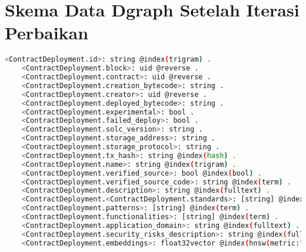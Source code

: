 \chapter{Skema Data Dgraph Setelah Iterasi Perbaikan}
\label{appendix:skema-dgraph-iterasi-perbaikan}

\begin{lstlisting}[language=bash]
    <ContractDeployment.id>: string @index(trigram) .
    <ContractDeployment.block>: uid @reverse .
    <ContractDeployment.contract>: uid @reverse .
    <ContractDeployment.creation_bytecode>: string .
    <ContractDeployment.creator>: uid @reverse .
    <ContractDeployment.deployed_bytecode>: string .
    <ContractDeployment.experimental>: bool .
    <ContractDeployment.failed_deploy>: bool .
    <ContractDeployment.solc_version>: string .
    <ContractDeployment.storage_address>: string .
    <ContractDeployment.storage_protocol>: string .
    <ContractDeployment.tx_hash>: string @index(hash) .
    <ContractDeployment.name>: string @index(trigram) .
    <ContractDeployment.verified_source>: bool @index(bool) .
    <ContractDeployment.verified_source_code>: string @index(term) .
    <ContractDeployment.description>: string @index(fulltext) .
    <ContractDeployment.<ContractDeployment.standards>: [string] @index(term) .
    <ContractDeployment.patterns>: [string] @index(term) .
    <ContractDeployment.functionalities>: [string] @index(term) .
    <ContractDeployment.application_domain>: string @index(fulltext) .
    <ContractDeployment.security_risks_description>: string @index(fulltext) .
    <ContractDeployment.embeddings>: float32vector @index(hnsw(metric:"euclidean")) .
\end{lstlisting}
